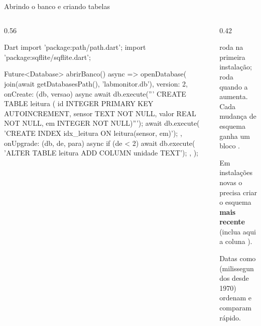 \documentclass[aspectratio=169,10pt]{beamer}
\begin{document}
\begin{frame}[fragile]{Abrindo o banco e criando tabelas}
  \begin{columns}[T]
    \begin{column}{0.56\textwidth}
\begin{codigo}[title=data/services/banco\_service.dart]{Dart}
import 'package:path/path.dart';
import 'package:sqflite/sqflite.dart';

Future<Database> abrirBanco() async => openDatabase(
  join(await getDatabasesPath(), 'labmonitor.db'),
  version: 2,
  onCreate: (db, versao) async {
    await db.execute('''
      CREATE TABLE leitura (
        id     INTEGER PRIMARY KEY AUTOINCREMENT,
        sensor TEXT NOT NULL,
        valor  REAL NOT NULL,
        em     INTEGER NOT NULL)''');
    await db.execute(
      'CREATE INDEX idx_leitura ON leitura(sensor, em)');
  },
  onUpgrade: (db, de, para) async {
    if (de < 2) await db.execute(
      'ALTER TABLE leitura ADD COLUMN unidade TEXT');
  },
);
\end{codigo}
    \end{column}
    \begin{column}{0.42\textwidth}
      \begin{conceito}
         roda na primeira instalação;  roda quando a  aumenta. Cada mudança de esquema ganha um bloco .
      \end{conceito}
      \begin{atencao}
        Em instalações novas o  precisa criar o esquema \textbf{mais recente} (inclua aqui a coluna ).
      \end{atencao}
      \begin{dica}
        Datas como  (milissegundos desde 1970) ordenam e comparam rápido.
      \end{dica}
    \end{column}
  \end{columns}
\end{frame}
\end{document}
